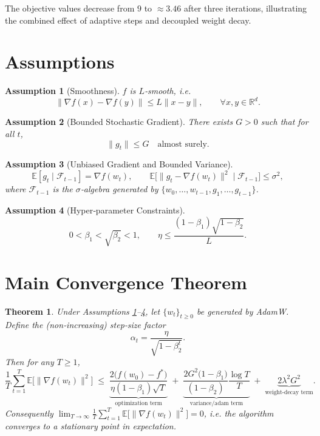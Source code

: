 \documentclass{article}
\newtheorem{theorem}{Theorem}
\newtheorem{assumption}{Assumption}
\newcommand{\E}{\mathbb{E}}
\newcommand{\R}{\mathbb{R}}
\begin{document}
The objective values decrease from $9$ to $\approx3.46$ after three iterations, illustrating the combined effect of adaptive steps and decoupled weight decay.

\section*{Assumptions}
\begin{assumption}[Smoothness]\label{ass:smooth}
$f$ is $L$‑smooth, i.e.
\[
\|\nabla f(x)-\nabla f(y)\| \le L\|x-y\|,\qquad \forall x,y\in\R^{d}.
\]
\end{assumption}
\begin{assumption}[Bounded Stochastic Gradient]\label{ass:bounded}
There exists $G>0$ such that for all $t$,
\[
\|g_{t}\|\le G\quad\text{almost surely}.
\]
\end{assumption}
\begin{assumption}[Unbiased Gradient and Bounded Variance]\label{ass:unbiased}
\[
\E[g_{t}\mid\mathcal{F}_{t-1}]=\nabla f(w_{t}),\qquad 
\E\big[\|g_{t}-\nabla f(w_{t})\|^{2}\mid\mathcal{F}_{t-1}\big]\le\sigma^{2},
\]
where $\mathcal{F}_{t-1}$ is the $\sigma$‑algebra generated by $\{w_{0},\dots,w_{t-1},g_{1},\dots,g_{t-1}\}$.
\end{assumption}
\begin{assumption}[Hyper‑parameter Constraints]\label{ass:hyper}
\[
0<\beta_{1}<\sqrt{\beta_{2}}<1,\qquad 
\eta\le \frac{(1-\beta_{1})\sqrt{1-\beta_{2}}}{L}.
\]
\end{assumption}

\section*{Main Convergence Theorem}
\begin{theorem}\label{thm:main}
Under Assumptions \ref{ass:smooth}–\ref{ass:hyper}, let $\{w_{t}\}_{t\ge0}$ be generated by AdamW. Define the (non‑increasing) step‑size factor
\[
\alpha_{t}= \frac{\eta}{\sqrt{1-\beta_{2}^{t}}}.
\]
Then for any $T\ge1$,
\[
\frac{1}{T}\sum_{t=1}^{T}\E\big[\|\nabla f(w_{t})\|^{2}\big]\;\le\;
\underbrace{\frac{2\big(f(w_{0})-f^{*}\big)}{\eta(1-\beta_{1})\sqrt{T}}}_{\text{optimization term}}
\;+\;
\underbrace{\frac{2G^{2}\big(1-\beta_{1}\big)}{(1-\beta_{2})}\frac{\log T}{T}}_{\text{variance/adam term}}
\;+\;
\underbrace{2\lambda^{2}G^{2}}_{\text{weight‑decay term}}.
\]
Consequently $\displaystyle\lim_{T\to\infty}\frac{1}{T}\sum_{t=1}^{T}\E\big[\|\nabla f(w_{t})\|^{2}\big]=0$, i.e. the algorithm converges to a stationary point in expectation.
\end{theorem}
\end{document}
